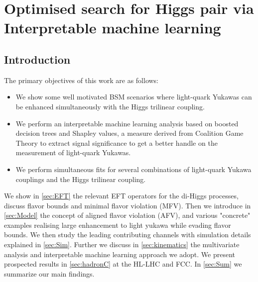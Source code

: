 
\chapter{ Optimised search for Higgs pair via Interpretable machine learning }\label{chap:overviewLightYuk}
\section{Introduction}
\label{sec:Intro}


The primary objectives of this work are as follows:

\begin{itemize}
	\item We show some well motivated BSM scenarios where light-quark Yukawas can be enhanced simultaneously with the Higgs trilinear coupling.
	\item We perform an interpretable machine learning analysis based on boosted decision trees and Shapley values, a measure derived from Coalition Game Theory to extract signal significance to get a better handle on the measurement of light-quark Yukawas.
	\item We perform simultaneous fits for several combinations of light-quark Yukawa couplings and the Higgs trilinear coupling.
\end{itemize}

We show in \autoref{sec:EFT} the relevant EFT operators for the di-Higgs processes, discuss flavor bounds and minimal flavor violation (MFV). Then we introduce in \autoref{sec:Model} the concept of aligned flavor violation (AFV), and various "concrete" examples realising large enhancement to light yukawa while evading flavor bounds. We then study the leading contributing channels with simulation details explained in \autoref{sec:Sim}. Further we discuss in \autoref{sec:kinematics} the multivariate analysis and interpretable machine learning approach we adopt. We present prospected results in \autoref{sec:hadronC} at the HL-LHC and FCC. In \autoref{sec:Sum} we summarize our main findings.

